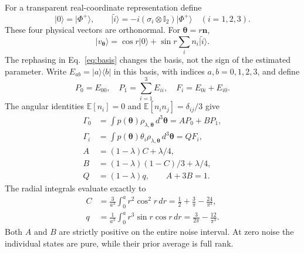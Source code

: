 \documentclass[aps,pra,reprint,amsmath,amssymb,nofootinbib,longbibliography,floatfix]{revtex4-2}
\newcommand{\ket}[1]{\lvert #1\rangle}
\newcommand{\bra}[1]{\langle #1\rvert}
\newcommand{\I}{\mathbb{I}}
\newcommand{\thv}{\bm{\theta}}
\begin{document}
For a transparent real-coordinate representation define
\begin{equation}
 \ket0=\ket{\Phi^+},\qquad
 \ket{\widetilde i}=-i(\sigma_i\otimes\I_2)\ket{\Phi^+}
 \quad(i=1,2,3).
 \label{eq:basis}
\end{equation}
These four physical vectors are orthonormal. For $\thv=r\bm n$,
\begin{equation}
 \ket{v_{\thv}}=\cos r\ket0+\sin r\sum_i n_i\ket{\widetilde i}.
 \label{eq:realstate}
\end{equation}
The rephasing in Eq.~\eqref{eq:basis} changes the basis, not the sign
of the estimated parameter. Write $E_{ab}=\ket a\bra b$ in this basis,
with indices $a,b=0,1,2,3$, and define
\begin{equation}
 P_0=E_{00},\quad P_1=\sum_{i=1}^3E_{ii},\quad F_i=E_{0i}+E_{i0}.
\end{equation}
The angular identities $\mathbb E[n_i]=0$ and
$\mathbb E[n_i n_j]=\delta_{ij}/3$ give
\begin{align}
 \Gamma_0&=\int p(\thv)\rho_{\lambda,\thv}\,d^3\thv
             =A P_0+B P_1,\label{eq:moments}\\
 \Gamma_i&=\int p(\thv)\theta_i\rho_{\lambda,\thv}\,d^3\thv
             =QF_i,\nonumber\\
 A&=(1-\lambda)C+\lambda/4,\nonumber\\
 B&=(1-\lambda)(1-C)/3+\lambda/4,\nonumber\\
 Q&=(1-\lambda)q,\qquad A+3B=1.\label{eq:ABQ}
\end{align}
The radial integrals evaluate exactly to
\begin{align}
 C&=\frac{3}{a^3}\int_0^a r^2\cos^2r\,dr
       =\frac12+\frac3\pi-\frac{24}{\pi^3},\label{eq:C}\\
 q&=\frac{1}{a^3}\int_0^a r^3\sin r\cos r\,dr
       =\frac{3}{2\pi}-\frac{12}{\pi^3}.\label{eq:q}
\end{align}
Both $A$ and $B$ are strictly positive on the entire noise interval.
At zero noise the individual states are pure, while their prior average
is full rank.
\end{document}
